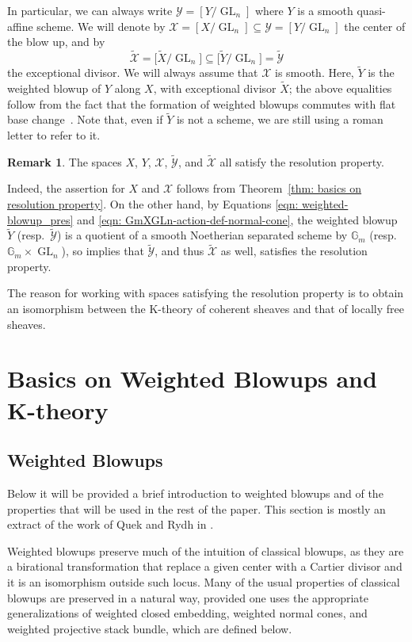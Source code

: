 \documentclass[12pt]{amsart}
\newcommand\G{\mathbb{G}}
\newcommand\tX{\widetilde{X}}
\newcommand\tY{\widetilde{Y}}
\newcommand{\cX}{\mathcal{X}}
\newcommand{\cY}{\mathcal{Y}}
\newcommand{\GL}{\operatorname{GL}}
\theoremstyle{definition}
\newtheorem{Rmk}[theorem]{Remark}
\begin{document}
In particular, we can always write $\cY=[Y/\GL_n]$ where $Y$ is a smooth quasi-affine scheme.
We will denote by $\cX= [X/\GL_n] \subseteq\cY= [Y/\GL_n]$ the center of the blow up, and by
$$
\widetilde{\cX}= \big[ \tX/\GL_n \big] \subseteq \big[ \tY/ \GL_n \big]= \widetilde{\cY}
$$
the exceptional divisor. We will always assume that $\cX$ is smooth. Here, $\tY$ is the weighted blowup of $Y$ along $X$, with exceptional divisor $\tX$; the above equalities follow from the fact that the formation of weighted blowups commutes with flat base change~\cite[Corollary 3.2.14]{quek-rydh-weighted-blowup}. Note that, even if $\widetilde{Y}$ is not a scheme, we are still using a roman letter to refer to it.

\begin{Rmk}
    The spaces $X$, $Y$, $\cX$, $\widetilde{\cY}$, and $\widetilde{\cX}$ all satisfy the resolution property.

    Indeed, the assertion for $X$ and $\cX$ follows from Theorem~\ref{thm: basics on resolution property}. On the other hand, by Equations \eqref{eqn: weighted-blowup_pres} and \eqref{eqn: GmXGLn-action-def-normal-cone}, the weighted blowup $\widetilde{Y}$ (resp.\ $\widetilde{\cY}$) is a quotient of a smooth Noetherian separated scheme by $\G_m$ (resp.\ $\G_m \times \GL_n$), so \cite[Theorem 5.7]{Thomason-equivariantKtheory} implies that $\widetilde{\cY}$, and thus $\widetilde{\cX}$ as well, satisfies the resolution property.
\end{Rmk}

The reason for working with spaces satisfying the resolution property is to obtain an isomorphism between the K-theory of coherent sheaves and that of locally free sheaves.

\section{Basics on Weighted Blowups and K-theory}\label{sec:weighted-blowups-and-K-theory}
\subsection{Weighted Blowups}\label{sub:weighted-blowups}

Below it will be provided a brief introduction to weighted blowups and of the properties that will be used in the rest of the paper. This section is mostly an extract of the work of Quek and Rydh in \cite{quek-rydh-weighted-blowup}.

Weighted blowups preserve much of the intuition of classical blowups, as they are a birational transformation that replace a given center with a Cartier divisor and it is an isomorphism outside such locus. Many of the usual properties of classical blowups are preserved in a natural way, provided one uses the appropriate generalizations of weighted closed embedding, weighted normal cones, and weighted projective stack bundle, which are defined below.
\end{document}
